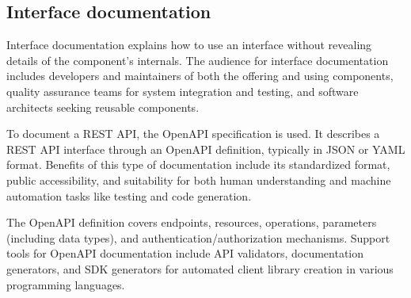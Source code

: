 \subsection{Interface documentation}
Interface documentation explains how to use an interface without revealing details of the component's internals. 
The audience for interface documentation includes developers and maintainers of both the offering and using components, quality assurance teams for system integration and testing, and software architects seeking reusable components.

To document a REST API, the OpenAPI specification is used.
It describes a REST API interface through an OpenAPI definition, typically in JSON or YAML format.
Benefits of this type of documentation include its standardized format, public accessibility, and suitability for both human understanding and machine automation tasks like testing and code generation.

The OpenAPI definition covers endpoints, resources, operations, parameters (including data types), and authentication/authorization mechanisms. 
Support tools for OpenAPI documentation include API validators, documentation generators, and SDK generators for automated client library creation in various programming languages.